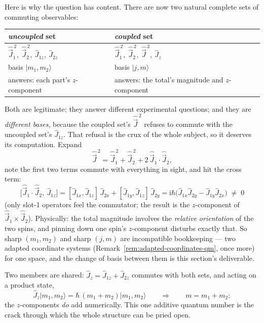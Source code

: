 \documentclass[11pt]{article}
\theoremstyle{plain}
\theoremstyle{definition}
\theoremstyle{remark}
\newcommand{\ii}{\mathrm{i}}
\newcommand{\op}[1]{\hat{#1}}
\newcommand{\ket}[1]{\lvert #1 \rangle}
\begin{document}
Here is why the question has content. There are now two natural
complete sets of commuting observables:
\begin{center}
\begin{tabular}{ll}
\toprule
\emph{uncoupled} set & \emph{coupled} set \\
\midrule
$\op{\vec J}_1^{\,2},\ \op{\vec J}_2^{\,2},\
\op J_{1z},\ \op J_{2z}$
& $\op{\vec J}_1^{\,2},\ \op{\vec J}_2^{\,2},\
\op{\vec J}^{\,2},\ \op J_z$ \\[2pt]
basis $\ket{m_1, m_2}$ & basis $\ket{j, m}$ \\[2pt]
answers: each part's $z$-component
& answers: the total's magnitude and $z$-component \\
\bottomrule
\end{tabular}
\end{center}
Both are legitimate; they answer different experimental questions;
and they are \emph{different bases}, because the coupled set's
$\op{\vec J}^{\,2}$ refuses to commute with the uncoupled set's
$\op J_{1z}$. That refusal is the crux of the whole subject, so it
deserves its computation. Expand
\begin{equation}
  \op{\vec J}^{\,2}
  = \op{\vec J}_1^{\,2} + \op{\vec J}_2^{\,2}
    + 2\,\op{\vec J}_1\!\cdot\op{\vec J}_2 ,
  \label{eq:J2-expansion}
\end{equation}
note the first two terms commute with everything in sight, and hit
the cross term:
\begin{equation}
  \bigl[\op{\vec J}_1\!\cdot\op{\vec J}_2,\ \op J_{1z}\bigr]
  = [\op J_{1x}, \op J_{1z}]\,\op J_{2x}
  + [\op J_{1y}, \op J_{1z}]\,\op J_{2y}
  = \ii\hbar\bigl(
      \op J_{1x}\op J_{2y} - \op J_{1y}\op J_{2x}
    \bigr)
  \;\ne\; 0
  \label{eq:crux-commutator}
\end{equation}
(only slot-1 operators feel the commutator; the result is the
$z$-component of $\op{\vec J}_1\times\op{\vec J}_2$). Physically:
the total magnitude involves the \emph{relative orientation} of the
two spins, and pinning down one spin's $z$-component disturbs
exactly that. So sharp $(m_1, m_2)$ and sharp $(j, m)$ are
incompatible bookkeeping --- two adapted coordinate systems
(Remark~\ref{rem:adapted-coordinates-qm}, once more) for one space,
and the change of basis between them is this section's deliverable.

Two members are shared: $\op J_z = \op J_{1z} + \op J_{2z}$
commutes with both sets, and acting on a product state,
\begin{equation}
  \op J_z\ket{m_1, m_2}
  = \hbar\,(m_1 + m_2)\ket{m_1, m_2}
  \qquad\Longrightarrow\qquad
  m = m_1 + m_2 :
  \label{eq:m-additive}
\end{equation}
the $z$-components \emph{do} add numerically. This one additive
quantum number is the crack through which the whole structure can
be pried open.
\end{document}
